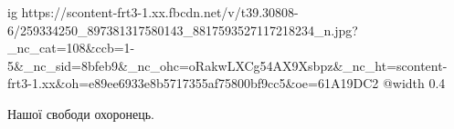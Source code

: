  
 
 
 
 

\ifcmt
  ig https://scontent-frt3-1.xx.fbcdn.net/v/t39.30808-6/259334250_897381317580143_8817593527117218234_n.jpg?_nc_cat=108&ccb=1-5&_nc_sid=8bfeb9&_nc_ohc=oRakwLXCg54AX9Xsbpz&_nc_ht=scontent-frt3-1.xx&oh=e89ee6933e8b5717355af75800bf9cc5&oe=61A19DC2
  @width 0.4
\fi

Нашої свободи охоронець.
